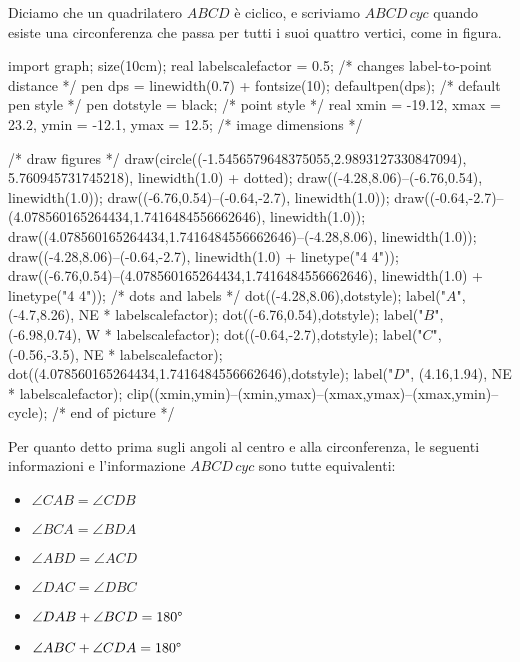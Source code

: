 \documentclass[11pt]{scrartcl}
\begin{document}
	\begin{definition}
		Diciamo che un quadrilatero $ABCD$ è ciclico, e scriviamo $ABCD\,cyc$ quando esiste una circonferenza che passa per tutti i suoi quattro vertici, come in figura.
		\begin{center}
			\begin{asy}
			import graph; size(10cm); 
			real labelscalefactor = 0.5; /* changes label-to-point distance */
			pen dps = linewidth(0.7) + fontsize(10); defaultpen(dps); /* default pen style */ 
			pen dotstyle = black; /* point style */ 
			real xmin = -19.12, xmax = 23.2, ymin = -12.1, ymax = 12.5;  /* image dimensions */
			
			/* draw figures */
			draw(circle((-1.5456579648375055,2.9893127330847094), 5.760945731745218), linewidth(1.0) + dotted); 
			draw((-4.28,8.06)--(-6.76,0.54), linewidth(1.0)); 
			draw((-6.76,0.54)--(-0.64,-2.7), linewidth(1.0)); 
			draw((-0.64,-2.7)--(4.078560165264434,1.7416484556662646), linewidth(1.0)); 
			draw((4.078560165264434,1.7416484556662646)--(-4.28,8.06), linewidth(1.0));
			draw((-4.28,8.06)--(-0.64,-2.7), linewidth(1.0) + linetype("4 4"));
			draw((-6.76,0.54)--(4.078560165264434,1.7416484556662646), linewidth(1.0) + linetype("4 4")); 
			/* dots and labels */
			dot((-4.28,8.06),dotstyle); 
			label("$A$", (-4.7,8.26), NE * labelscalefactor); 
			dot((-6.76,0.54),dotstyle); 
			label("$B$", (-6.98,0.74), W * labelscalefactor); 
			dot((-0.64,-2.7),dotstyle); 
			label("$C$", (-0.56,-3.5), NE * labelscalefactor); 
			dot((4.078560165264434,1.7416484556662646),dotstyle); 
			label("$D$", (4.16,1.94), NE * labelscalefactor); 
			clip((xmin,ymin)--(xmin,ymax)--(xmax,ymax)--(xmax,ymin)--cycle); 
			/* end of picture */
			\end{asy}
		\end{center}
	\end{definition}
	
	\begin{remark}
		Per quanto detto prima sugli angoli al centro e alla circonferenza, le seguenti informazioni e l'informazione $ABCD\,cyc$ sono tutte equivalenti:
		\begin{itemize}
			\item $\angle CAB = \angle CDB$ 
			\item $\angle BCA = \angle BDA$ 
			\item $\angle ABD = \angle ACD$ 
			\item $\angle DAC = \angle DBC$ 
			\item $\angle DAB + \angle BCD = 180 \degree$ 
			\item $\angle ABC + \angle CDA = 180 \degree$ 
		\end{itemize}
	\end{remark}
	
\end{document}
